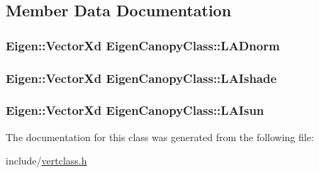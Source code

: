 \subsection{Member Data Documentation}
\subsubsection[{\texorpdfstring{L\+A\+Dnorm}{LADnorm}}]{\setlength{\rightskip}{0pt plus 5cm}Eigen\+::\+Vector\+Xd Eigen\+Canopy\+Class\+::\+L\+A\+Dnorm}\hypertarget{class_eigen_canopy_class_a9895cb0e1f7a43d2bb8c751e3c225c81}{}\label{class_eigen_canopy_class_a9895cb0e1f7a43d2bb8c751e3c225c81}
\subsubsection[{\texorpdfstring{L\+A\+Ishade}{LAIshade}}]{\setlength{\rightskip}{0pt plus 5cm}Eigen\+::\+Vector\+Xd Eigen\+Canopy\+Class\+::\+L\+A\+Ishade}\hypertarget{class_eigen_canopy_class_a1f4069415b737669f9f591a747fa7c68}{}\label{class_eigen_canopy_class_a1f4069415b737669f9f591a747fa7c68}
\subsubsection[{\texorpdfstring{L\+A\+Isun}{LAIsun}}]{\setlength{\rightskip}{0pt plus 5cm}Eigen\+::\+Vector\+Xd Eigen\+Canopy\+Class\+::\+L\+A\+Isun}\hypertarget{class_eigen_canopy_class_a37d7b59ac5ebbb2327f1f86bb27edd13}{}\label{class_eigen_canopy_class_a37d7b59ac5ebbb2327f1f86bb27edd13}


The documentation for this class was generated from the following file\+:\begin{DoxyCompactItemize}
\item 
include/\hyperlink{vertclass_8h}{vertclass.\+h}\end{DoxyCompactItemize}
